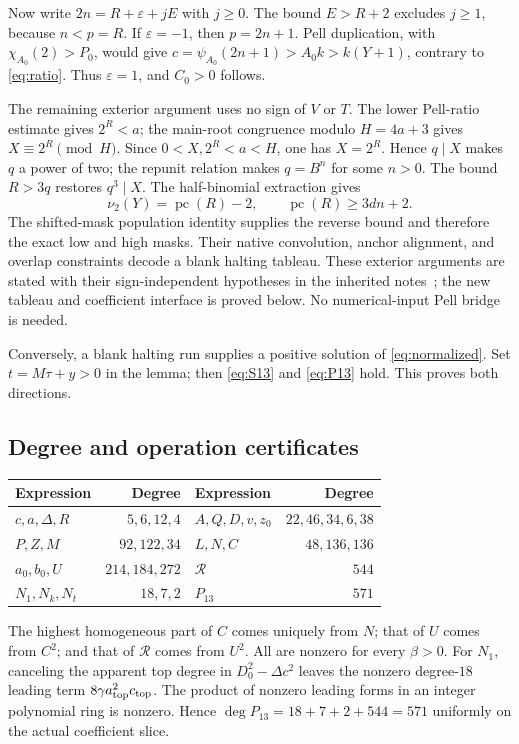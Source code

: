 \documentclass[11pt,a4paper]{article}
\theoremstyle{remark}\newtheorem{remark}[theorem]{Remark}
\newcommand{\pc}{\operatorname{pc}}
\begin{document}
Now write $2n=R+\varepsilon+jE$ with $j\ge0$.
The bound $E>R+2$ excludes $j\ge1$, because $n<p=R$.
If $\varepsilon=-1$, then $p=2n+1$. Pell duplication, with
$\chi_{A_0}(2)>P_0$, would give
$c=\psi_{A_0}(2n+1)>A_0 k>k(Y+1)$, contrary to
\eqref{eq:ratio}. Thus $\varepsilon=1$, and $C_0>0$ follows.

The remaining exterior argument uses no sign of $V$ or $T$.
The lower Pell-ratio estimate gives $2^R<a$; the main-root
congruence modulo $H=4a+3$ gives $X\equiv2^R\pmod H$.
Since $0<X,2^R<a<H$, one has $X=2^R$. Hence $q\mid X$ makes
$q$ a power of two; the repunit relation makes $q=B^n$ for some
$n>0$. The bound $R>3q$ restores $q^3\mid X$.
The half-binomial extraction gives
\[
 \nu_2(Y)=\pc(R)-2,\qquad \pc(R)\ge3dn+2.
\]
The shifted-mask population identity supplies the reverse bound and
therefore the exact low and high masks. Their native convolution,
anchor alignment, and overlap constraints decode a blank halting
tableau. These exterior arguments are stated with their sign-independent
hypotheses in the inherited notes~\cite{scout,half,blank}; the new
tableau and coefficient interface is proved below. No numerical-input
Pell bridge is needed.

Conversely, a blank halting run supplies a positive solution of
\eqref{eq:normalized}. Set $t=M\tau+y>0$ in the lemma; then
\eqref{eq:S13} and \eqref{eq:P13} hold. This proves both directions.

\subsection{Degree and operation certificates}
\begin{center}\small
\begin{tabular}{lr@{\qquad}lr}
\toprule
Expression & Degree & Expression & Degree\\
\midrule
$c,a,\Delta,R$ &$5,6,12,4$&$A,Q,D,v,z_0$&$22,46,34,6,38$\\
$P,Z,M$&$92,122,34$&$L,N,C$&$48,136,136$\\
$a_0,b_0,U$&$214,184,272$&$\mathcal R$&$544$\\
$N_1,N_k,N_t$&$18,7,2$&$P_{13}$&$571$\\
\bottomrule
\end{tabular}
\end{center}
The highest homogeneous part of $C$ comes uniquely from $N$;
that of $U$ comes from $C^2$; and that of $\mathcal R$ comes from
$U^2$. All are nonzero for every $\beta>0$. For $N_1$, canceling
the apparent top degree in $D_0^2-\Delta c^2$ leaves the nonzero
degree-$18$ leading term $8\gamma a_{\rm top}^2c_{\rm top}$.
The product of nonzero leading forms in an integer polynomial ring
is nonzero. Hence $\deg P_{13}=18+7+2+544=571$ uniformly on the
actual coefficient slice.
\end{document}
